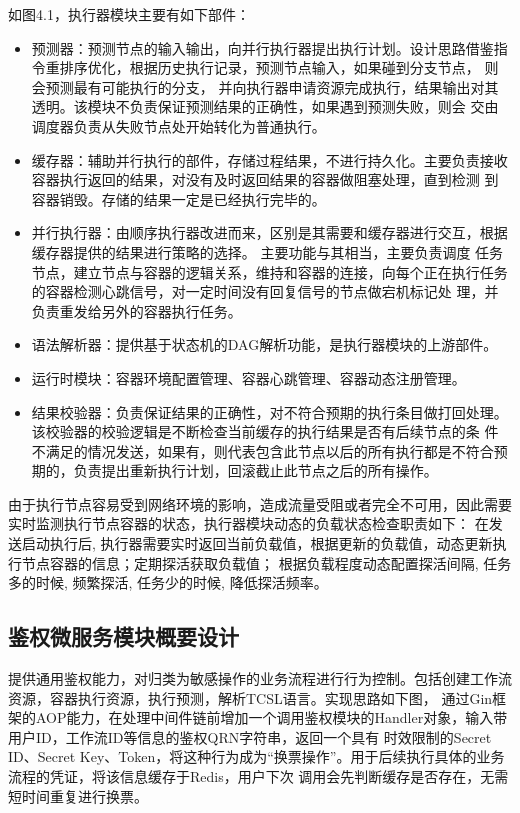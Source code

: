 如图4.1，执行器模块主要有如下部件：
\begin{itemize}
    \item 预测器：预测节点的输入输出，向并行执行器提出执行计划。设计思路借鉴指令重排序优化，根据历史执行记录，预测节点输入，如果碰到分支节点，
    则会预测最有可能执行的分支， 并向执行器申请资源完成执行，结果输出对其透明。该模块不负责保证预测结果的正确性，如果遇到预测失败，则会
    交由调度器负责从失败节点处开始转化为普通执行。
    \item 缓存器：辅助并行执行的部件，存储过程结果，不进行持久化。主要负责接收容器执行返回的结果，对没有及时返回结果的容器做阻塞处理，直到检测
    到容器销毁。存储的结果一定是已经执行完毕的。
    \item 并行执行器：由顺序执行器改进而来，区别是其需要和缓存器进行交互，根据缓存器提供的结果进行策略的选择。 主要功能与其相当，主要负责调度
    任务节点，建立节点与容器的逻辑关系，维持和容器的连接，向每个正在执行任务的容器检测心跳信号，对一定时间没有回复信号的节点做宕机标记处
    理，并负责重发给另外的容器执行任务。
    \item 语法解析器：提供基于状态机的DAG解析功能，是执行器模块的上游部件。
    \item 运行时模块：容器环境配置管理、容器心跳管理、容器动态注册管理。
    \item 结果校验器：负责保证结果的正确性，对不符合预期的执行条目做打回处理。该校验器的校验逻辑是不断检查当前缓存的执行结果是否有后续节点的条
    件不满足的情况发送，如果有，则代表包含此节点以后的所有执行都是不符合预期的，负责提出重新执行计划，回滚截止此节点之后的所有操作。

\end{itemize}

由于执行节点容易受到网络环境的影响，造成流量受阻或者完全不可用，因此需要实时监测执行节点容器的状态，执行器模块动态的负载状态检查职责如下：
在发送启动执行后, 执行器需要实时返回当前负载值，根据更新的负载值，动态更新执行节点容器的信息；定期探活获取负载值；
根据负载程度动态配置探活间隔, 任务多的时候, 频繁探活, 任务少的时候, 降低探活频率。


\subsection{鉴权微服务模块概要设计}

提供通用鉴权能力，对归类为敏感操作的业务流程进行行为控制。包括创建工作流资源，容器执行资源，执行预测，解析TCSL语言。实现思路如下图，
通过Gin框架的AOP能力，在处理中间件链前增加一个调用鉴权模块的Handler对象，输入带用户ID，工作流ID等信息的鉴权QRN字符串，返回一个具有
时效限制的Secret ID、Secret Key、Token，将这种行为成为“换票操作”。用于后续执行具体的业务流程的凭证，将该信息缓存于Redis，用户下次
调用会先判断缓存是否存在，无需短时间重复进行换票。

